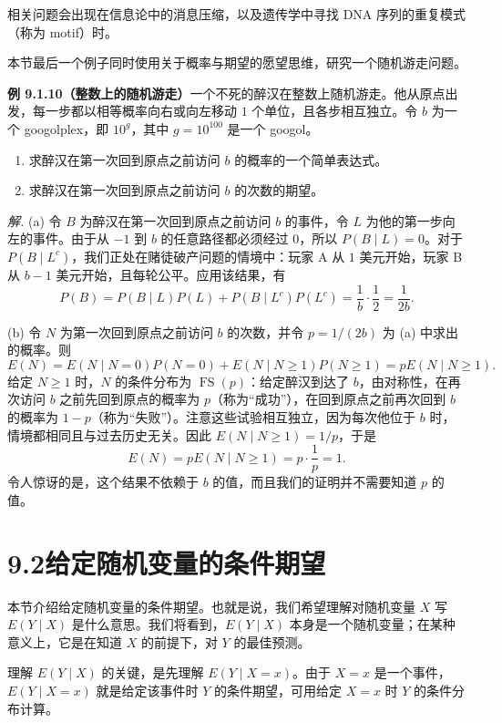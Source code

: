 \documentclass[UTF8,12pt,a4paper,fontset=fandol]{ctexart}
\begin{document}
相关问题会出现在信息论中的消息压缩，以及遗传学中寻找 DNA 序列的重复模式（称为 motif）时。

本节最后一个例子同时使用关于概率与期望的愿望思维，研究一个随机游走问题。

\noindent\textbf{例 9.1.10（整数上的随机游走）}\quad 一个不死的醉汉在整数上随机游走。他从原点出发，每一步都以相等概率向右或向左移动 $1$ 个单位，且各步相互独立。令 $b$ 为一个 googolplex，即 $10^g$，其中 $g=10^{100}$ 是一个 googol。
\begin{enumerate}
  \item[(a)] 求醉汉在第一次回到原点之前访问 $b$ 的概率的一个简单表达式。
  \item[(b)] 求醉汉在第一次回到原点之前访问 $b$ 的次数的期望。
\end{enumerate}

\noindent\textit{解.}\quad
(a) 令 $B$ 为醉汉在第一次回到原点之前访问 $b$ 的事件，令 $L$ 为他的第一步向左的事件。由于从 $-1$ 到 $b$ 的任意路径都必须经过 $0$，所以 $P(B\mid L)=0$。对于 $P(B\mid L^c)$，我们正处在赌徒破产问题的情境中：玩家 A 从 $1$ 美元开始，玩家 B 从 $b-1$ 美元开始，且每轮公平。应用该结果，有
\[
  P(B)=P(B\mid L)P(L)+P(B\mid L^c)P(L^c)
  =\frac1b\cdot\frac12=\frac{1}{2b}.
\]

(b) 令 $N$ 为第一次回到原点之前访问 $b$ 的次数，并令 $p=1/(2b)$ 为 (a) 中求出的概率。则
\[
  E(N)=E(N\mid N=0)P(N=0)+E(N\mid N\ge1)P(N\ge1)
  =pE(N\mid N\ge1).
\]
给定 $N\ge1$ 时，$N$ 的条件分布为 $\operatorname{FS}(p)$：给定醉汉到达了 $b$，由对称性，在再次访问 $b$ 之前先回到原点的概率为 $p$（称为“成功”），在回到原点之前再次回到 $b$ 的概率为 $1-p$（称为“失败”）。注意这些试验相互独立，因为每次他位于 $b$ 时，情境都相同且与过去历史无关。因此 $E(N\mid N\ge1)=1/p$，于是
\[
  E(N)=pE(N\mid N\ge1)=p\cdot\frac1p=1.
\]
令人惊讶的是，这个结果不依赖于 $b$ 的值，而且我们的证明并不需要知道 $p$ 的值。

\section*{9.2\quad 给定随机变量的条件期望}

本节介绍给定随机变量的条件期望。也就是说，我们希望理解对随机变量 $X$ 写 $E(Y\mid X)$ 是什么意思。我们将看到，$E(Y\mid X)$ 本身是一个随机变量；在某种意义上，它是在知道 $X$ 的前提下，对 $Y$ 的最佳预测。

理解 $E(Y\mid X)$ 的关键，是先理解 $E(Y\mid X=x)$。由于 $X=x$ 是一个事件，$E(Y\mid X=x)$ 就是给定该事件时 $Y$ 的条件期望，可用给定 $X=x$ 时 $Y$ 的条件分布计算。
\end{document}
